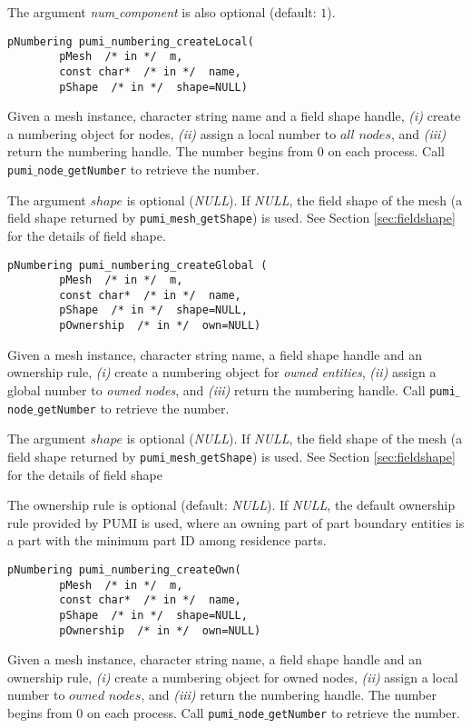 The argument \emph{num$\_$component} is also optional (default: $1$). 

\begin{verbatim}
pNumbering pumi_numbering_createLocal(
        pMesh  /* in */  m,
        const char*  /* in */  name,
        pShape  /* in */  shape=NULL)
\end{verbatim}\vspace{-.5cm}\hspace{1cm}
Given a mesh instance, character string name and a field shape handle, \emph{(i)} create a numbering object for nodes, \emph{(ii)} assign a local number to $all$ $nodes$, and \emph{(iii)} return the numbering handle. The number begins from 0 on each process. Call \texttt{pumi$\_$node$\_$getNumber} to retrieve the number.

The argument $shape$ is optional (\emph{NULL}). If \emph{NULL}, the field shape of the mesh 
(a field shape returned by \texttt{pumi$\_$mesh$\_$getShape}) is used. See Section \ref{sec:fieldshape} for the details of field shape.

\begin{verbatim}
pNumbering pumi_numbering_createGlobal (
        pMesh  /* in */  m,
        const char*  /* in */  name,
        pShape  /* in */  shape=NULL,
        pOwnership  /* in */  own=NULL)
\end{verbatim}\vspace{-.5cm}\hspace{1cm}
Given a mesh instance, character string name, a field shape handle and an ownership rule, \emph{(i)} create a numbering object for \emph{owned entities}, \emph{(ii)} assign a global number to \emph{owned nodes}, and \emph{(iii)} return the numbering handle. Call \texttt{pumi$\_$node$\_$getNumber} to retrieve the number.

The argument $shape$ is optional (\emph{NULL}). If \emph{NULL}, the field shape of the mesh 
(a field shape returned by \texttt{pumi$\_$mesh$\_$getShape}) is used. See Section \ref{sec:fieldshape} for the details of field shape

The ownership rule is optional (default: \emph{NULL}). If \emph{NULL}, the default ownership rule provided by PUMI is used, where an owning part of part boundary entities is a part with the minimum part ID among residence parts.

\begin{verbatim}
pNumbering pumi_numbering_createOwn(
        pMesh  /* in */  m,
        const char*  /* in */  name,
        pShape  /* in */  shape=NULL,
        pOwnership  /* in */  own=NULL)
\end{verbatim}\vspace{-.5cm}\hspace{1cm}
Given a mesh instance, character string name, a field shape handle and an ownership rule, \emph{(i)} create a numbering object for owned nodes, \emph{(ii)} assign a local number to $owned$ $nodes$, and \emph{(iii)} return the numbering handle. The number begins from 0 on each process. Call \texttt{pumi$\_$node$\_$getNumber} to retrieve the number.

